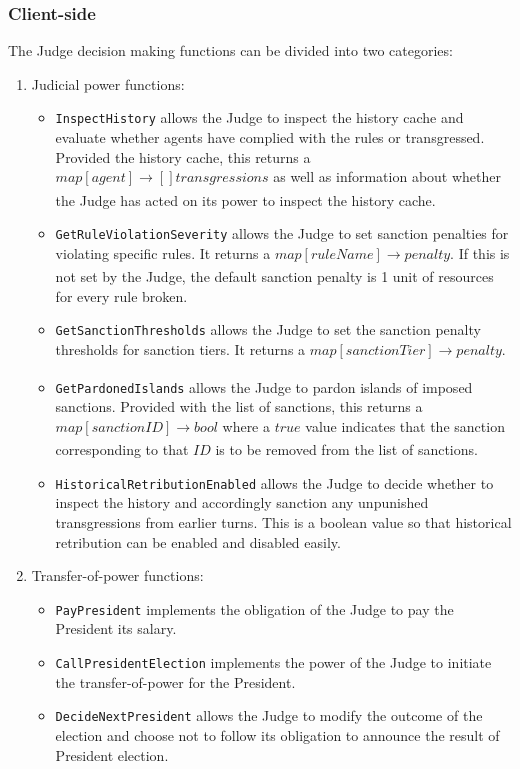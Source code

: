 \subsubsection{Client-side}
The Judge decision making functions can be divided into two categories:
\begin{enumerate}
    \item Judicial power functions:
    \begin{itemize}
        \item \texttt{InspectHistory} allows the Judge to inspect the history cache and evaluate whether agents have complied with the rules or transgressed. Provided the history cache, this returns a $map[agent] \xrightarrow[]{} []transgressions$ as well as information about whether the Judge has acted on its power to inspect the history cache.
        \item \texttt{GetRuleViolationSeverity} allows the Judge to set sanction penalties for violating specific rules. It returns a $map[ruleName] \xrightarrow[]{} penalty$. If this is not set by the Judge, the default sanction penalty is 1 unit of resources for every rule broken.
        \item \texttt{GetSanctionThresholds} allows the Judge to set the sanction penalty thresholds for sanction tiers. It returns a $map[sanctionTier] \xrightarrow[]{} penalty$.
        \item \texttt{GetPardonedIslands} allows the Judge to pardon islands of imposed sanctions. Provided with the list of sanctions, this returns a $map[sanctionID] \xrightarrow[]{} bool$ where a $true$ value indicates that the sanction corresponding to that $ID$ is to be removed from the list of sanctions.
        \item \texttt{HistoricalRetributionEnabled} allows the Judge to decide whether to inspect the history and accordingly sanction any unpunished transgressions from earlier turns. This is a boolean value so that historical retribution can be enabled and disabled easily.
    \end{itemize}
    \item Transfer-of-power functions:
    \begin{itemize}
        \item \texttt{PayPresident} implements the obligation of the Judge to pay the President its salary. 
        \item \texttt{CallPresidentElection} implements the power of the Judge to initiate the transfer-of-power for the President.
        \item \texttt{DecideNextPresident} allows the Judge to modify the outcome of the election and choose not to follow its obligation to announce the result of President election.
    \end{itemize}
\end{enumerate}
